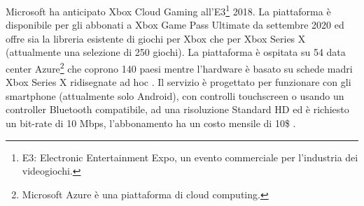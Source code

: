 Microsoft ha anticipato Xbox Cloud Gaming all'E3\footnote{E3: Electronic Entertainment Expo, un evento commerciale per l'industria dei videogiochi.} 2018. La piattaforma è disponibile per gli abbonati a Xbox Game Pass Ultimate da settembre 2020 ed offre sia la libreria esistente di giochi per Xbox che per Xbox Series X (attualmente una selezione di 250 giochi). La piattaforma è ospitata su 54 data center Azure\footnote{Microsoft Azure è una piattaforma di cloud computing.} che coprono 140 paesi \parencite{xCloud_beta} mentre l'hardware è basato su schede madri Xbox Series X ridisegnate ad hoc \parencite{xCloudBlade}. Il servizio è progettato per funzionare con gli smartphone (attualmente solo Android), con controlli touchscreen o usando un controller Bluetooth compatibile, ad una risoluzione Standard HD ed è richiesto un bit-rate di 10 Mbps, l'abbonamento ha un costo mensile di 10\$ \parencite{Xbox_Game_Pass_cloud_gaming}.

